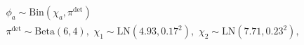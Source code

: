 \begin{gather}
  \phi_{a} \sim \text{Bin}(\chi_{a}, \pi^{\text{det}}) \\
  \pi^{\text{det}} \sim \text{Beta}(6, 4), \,\,
  \chi_{1} \sim \text{LN}(4.93, 0.17^2), \,\,
  \chi_{2} \sim \text{LN}(7.71, 0.23^2),
  \label{eqn:sev-submodel}
\end{gather}